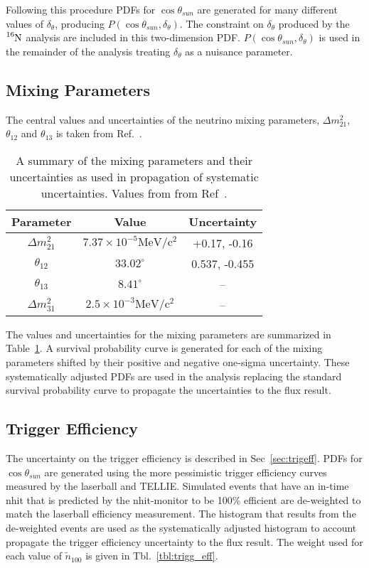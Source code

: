Following this procedure PDFs for $\cos\theta_{sun}$ are generated for many different
values of $\delta_{\theta}$, producing $P(\cos\theta_{sun}, \delta_{\theta})$.
The constraint on $\delta_{\theta}$ produced by the $\ce{^{16}N}$ analysis
are included in this two-dimension PDF\@.
$P(\cos\theta_{sun}, \delta_{\theta})$ is used in the remainder of the analysis
treating $\delta_{\theta}$ as a nuisance parameter.

\subsection{Mixing Parameters}
The central values and uncertainties of the neutrino mixing parameters, $\Delta
m^{2}_{21}$, $\theta_{12}$ and $\theta_{13}$ is taken from Ref.~\citep{pdg_globalfit}.
\begin{table}
    \centering
    \begin{tabular}{c | c | c}
        Parameter & Value & Uncertainty\\
        \hline
        $\Delta m^{2}_{21}$ & $7.37\times10^{-5} \mathrm{MeV}/\mathrm{c}^{2}$ & +0.17, -0.16\\
        $\theta_{12}$ & $33.02^{\circ}$ & 0.537, -0.455 \\
        $\theta_{13}$ & $8.41^{\circ}$ & -- \\
        $\Delta m^{2}_{31}$ & $2.5\times10^{-3}\mathrm{MeV}/\mathrm{c}^{2}$ & -- \\
    \end{tabular}
    \caption{A summary of the mixing parameters and their uncertainties as used in 
    propagation of systematic uncertainties. Values from from Ref~\citep{pdg_globalfit}.}
\label{tbl:mixing_values}
\end{table}
The values and uncertainties for the mixing parameters
are summarized in Table~\ref{tbl:mixing_values}.
A survival probability curve is generated for each of the mixing parameters
shifted by their positive and negative one-sigma uncertainty.
These systematically adjusted PDFs are used in the analysis replacing the
standard survival probability curve to propagate the uncertainties to the
flux result.
\subsection{Trigger Efficiency}
The uncertainty on the trigger efficiency is described in Sec~\ref{sec:trigeff}.
PDFs for $\cos\theta_{sun}$ are generated using the more pessimistic
trigger efficiency curves measured by the laserball and TELLIE\@.
Simulated events that have an in-time nhit that is predicted by the nhit-monitor
to be 100\% efficient are de-weighted to match the laserball efficiency
measurement.
The histogram that results from the de-weighted events are used as the systematically
adjusted histogram to account propagate the trigger efficiency uncertainty to the
flux result.
The weight used for each value of $\tilde{n}_{100}$ is given in Tbl.~\ref{tbl:trigg_eff}.

